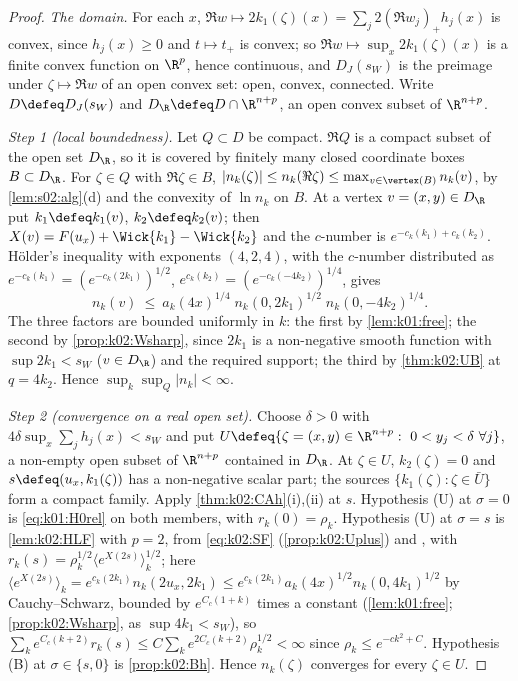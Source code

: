 \begin{proof}
\emph{The domain.} For each $x$, $\Re w\mapsto2k_1(\zeta)(x)=\sum_j2(\Re w_j)_+h_j(x)$ is convex, since $h_j(x)\ge0$ and $t\mapsto t_+$ is convex; so $\Re w\mapsto\sup_x2k_1(\zeta)(x)$ is a finite convex function on $\R^p$, hence continuous, and $D_J(s_W)$ is the preimage under $\zeta\mapsto\Re w$ of an open convex set: open, convex, connected. Write $D\defeq D_J(s_W)$ and $D_\R\defeq D\cap\R^{n+p}$, an open convex subset of $\R^{n+p}$.

\emph{Step 1 (local boundedness).} Let $Q\subset D$ be compact. $\Re Q$ is a compact subset of the open set $D_\R$, so it is covered by finitely many closed coordinate boxes $B\subset D_\R$. For $\zeta\in Q$ with $\Re\zeta\in B$, $|n_k(\zeta)|\le n_k(\Re\zeta)\le\max_{v\in\vertex(B)}n_k(v)$, by \cref{lem:s02:alg}(d) and the convexity of $\ln n_k$ on $B$. At a vertex $v=(x,y)\in D_\R$ put $k_1\defeq k_1(v)$, $k_2\defeq k_2(v)$; then $X(v)=F(u_x)+\Wick{k_1}-\Wick{k_2}$ and the $c$-number is $e^{-c_k(k_1)+c_k(k_2)}$. Hölder's inequality with exponents $(4,2,4)$, with the $c$-number distributed as $e^{-c_k(k_1)}=(e^{-c_k(2k_1)})^{1/2}$, $e^{c_k(k_2)}=(e^{-c_k(-4k_2)})^{1/4}$, gives
\[
n_k(v)\ \le\ a_k(4x)^{1/4}\;n_k(0,2k_1)^{1/2}\;n_k(0,-4k_2)^{1/4}.
\]
The three factors are bounded uniformly in $k$: the first by \cref{lem:k01:free}; the second by \cref{prop:k02:Wsharp}, since $2k_1$ is a non-negative smooth function with $\sup2k_1<s_W$ ($v\in D_\R$) and the required support; the third by \cref{thm:k02:UB} at $q=4k_2$. Hence $\sup_k\sup_Q|n_k|<\infty$.

\emph{Step 2 (convergence on a real open set).} Choose $\delta>0$ with $4\delta\sup_x\sum_jh_j(x)<s_W$ and put $U\defeq\{\zeta=(x,y)\in\R^{n+p}:\ 0<y_j<\delta\ \forall j\}$, a non-empty open subset of $\R^{n+p}$ contained in $D_\R$. At $\zeta\in U$, $k_2(\zeta)=0$ and $s\defeq(u_x,k_1(\zeta))$ has a non-negative scalar part; the sources $\{k_1(\zeta):\zeta\in\bar U\}$ form a compact family. Apply \cref{thm:k02:CAh}(i),(ii) at $s$. Hypothesis (U) at $\sigma=0$ is \eqref{eq:k01:H0rel} on both members, with $r_k(0)=\rho_k$. Hypothesis (U) at $\sigma=s$ is \cref{lem:k02:HLF} with $p=2$, from \eqref{eq:k02:SF} (\cref{prop:k02:Uplus}) and \Rzero, with $r_k(s)=\rho_k^{1/2}\langle e^{X(2s)}\rangle_k^{1/2}$; here $\langle e^{X(2s)}\rangle_k=e^{c_k(2k_1)}n_k(2u_x,2k_1)\le e^{c_k(2k_1)}a_k(4x)^{1/2}n_k(0,4k_1)^{1/2}$ by Cauchy--Schwarz, bounded by $e^{C_c(1+k)}$ times a constant (\cref{lem:k01:free}; \cref{prop:k02:Wsharp}, as $\sup4k_1<s_W$), so $\sum_ke^{C_c(k+2)}r_k(s)\le C\sum_ke^{2C_c(k+2)}\rho_k^{1/2}<\infty$ since $\rho_k\le e^{-ck^2+C}$. Hypothesis (B) at $\sigma\in\{s,0\}$ is \cref{prop:k02:Bh}. Hence $n_k(\zeta)$ converges for every $\zeta\in U$.


\end{proof}
